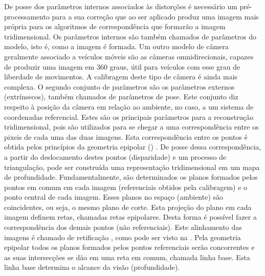 De posse dos parâmetros internos associados às distorções é necessário um
pré-processamento para a sua correção que ao ser aplicado produz uma imagem mais
própria para os algoritmos de correspondência que formarão a imagem
tridimensional. Os parâmetros internos são também chamados de parâmetros do
modelo, isto é, como a imagem é formada. Um outro modelo de câmera geralmente
associado a veículos móveis são as câmeras omnidirecionais, capazes de produzir
uma imagem em 360 graus, útil para veículos com esse grau de liberdade de
movimentos. A calibragem deste tipo de câmera é ainda mais complexa. O segundo
conjunto de parâmetros são os parâmetros externos (extrínsecos), também chamados
de parâmetros de pose. Este conjunto diz respeito à posição da câmera em relação
ao ambiente, no caso, a um sistema de coordenadas referencial. Estes são os
principais parâmetros para a reconstrução tridimensional, pois são utilizados
para se chegar a uma correspondência entre os pixeis de cada uma das duas
imagens. Esta correspondência entre os pontos é obtida pelos princípios da
geometria epipolar () \cite{Faugeras1993}. De posse dessa
correspondência, a partir do deslocamento destes pontos (disparidade) e um
processo de triangulação, pode ser construída uma representação tridimensional
em um mapa de profundidade. Fundamentalmente, são determinados os planos
formados pelos pontos em comum em cada imagem (referenciais obtidos pela
calibragem) e o ponto central de cada imagem. Esses planos no espaço (ambiente)
são coincidentes, ou seja, o mesmo plano de corte. Esta projeção do plano em
cada imagem definem retas, chamadas retas epipolares. Desta forma é possível
fazer a correspondência dos demais pontos (não referenciais). Este alinhamento
das imagens é chamado de retificação \cite{Fusiello2000}, como pode ser visto
na . Pela geometria epipolar todos os planos formados
pelos pontos referenciais serão concorrentes e as suas intersecções se dão em
uma reta em comum, chamada linha base. Esta linha base determina o alcance da
visão (profundidade).

